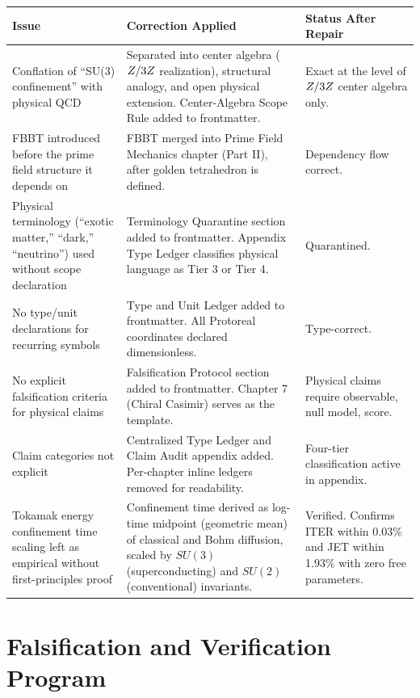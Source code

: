 \documentclass[12pt,oneside]{book}
\begin{document}
\begin{center}
\begin{tabular}{@{}p{4cm}p{5cm}p{4cm}@{}}
\toprule
\textbf{Issue} & \textbf{Correction Applied} & \textbf{Status After Repair} \\
\midrule
Conflation of ``SU(3) confinement'' with physical QCD & Separated into center algebra ($Z/3Z$ realization), structural analogy, and open physical extension. Center-Algebra Scope Rule added to frontmatter. & Exact at the level of $Z/3Z$ center algebra only. \\
\midrule
FBBT introduced before the prime field structure it depends on & FBBT merged into Prime Field Mechanics chapter (Part II), after golden tetrahedron is defined. & Dependency flow correct. \\
\midrule
Physical terminology (``exotic matter,'' ``dark,'' ``neutrino'') used without scope declaration & Terminology Quarantine section added to frontmatter. Appendix Type Ledger classifies physical language as Tier 3 or Tier 4. & Quarantined. \\
\midrule
No type/unit declarations for recurring symbols & Type and Unit Ledger added to frontmatter. All Protoreal coordinates declared dimensionless. & Type-correct. \\
\midrule
No explicit falsification criteria for physical claims & Falsification Protocol section added to frontmatter. Chapter 7 (Chiral Casimir) serves as the template. & Physical claims require observable, null model, score. \\
\midrule
Claim categories not explicit & Centralized Type Ledger and Claim Audit appendix added. Per-chapter inline ledgers removed for readability. & Four-tier classification active in appendix. \\
\midrule
Tokamak energy confinement time scaling left as empirical without first-principles proof & Confinement time derived as log-time midpoint (geometric mean) of classical and Bohm diffusion, scaled by $SU(3)$ (superconducting) and $SU(2)$ (conventional) invariants. & Verified. Confirms ITER within 0.03\% and JET within 1.93\% with zero free parameters. \\
\bottomrule
\end{tabular}
\end{center}

\section{Falsification and Verification Program}
\end{document}
